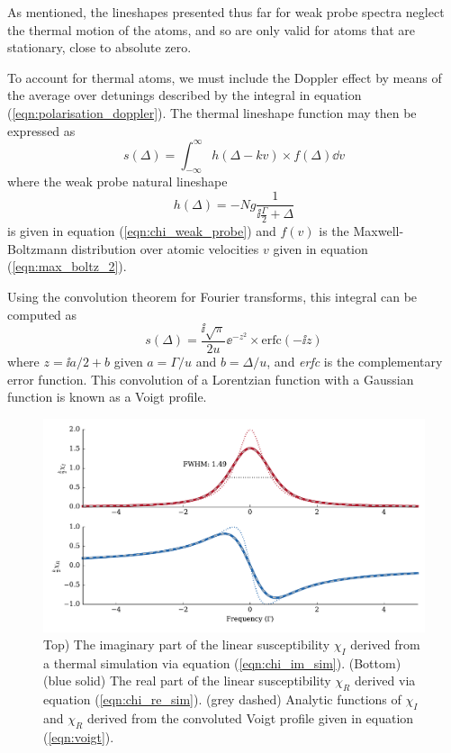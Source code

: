     As mentioned, the lineshapes presented thus far for weak probe spectra
    neglect the thermal motion of the atoms, and so are only valid for atoms
    that are stationary, \ie close to absolute zero. 

    To account for thermal atoms, we must include the Doppler effect by means of
    the average over detunings described by the integral in equation
    (\ref{eqn:polarisation_doppler}). The thermal lineshape function may then be
    expressed as
    \begin{equation}
      s(\Delta) = \int_{-\infty}^\infty h(\Delta - k v) \times f(\Delta) \dd v
    \end{equation}
    where the weak probe natural lineshape
    \begin{equation}
      h(\Delta) = -Ng \frac{1}{\ii \frac{\Gamma}{2} + \Delta}
    \end{equation}
    is given in equation (\ref{eqn:chi_weak_probe}) and $f(v)$ is the Maxwell-
    Boltzmann distribution over atomic velocities $v$ given in equation
    (\ref{eqn:max_boltz_2}).

    Using the convolution theorem for Fourier transforms, this integral can be computed as
    \begin{equation}
      s(\Delta) = \frac{\ii\sqrt{\pi}}{2u} \ee^{-z^2} \times \mathrm{erfc}(-\ii z)
      \label{eqn:voigt}
    \end{equation}
    where $z = \ii a/2  + b$ given $a = \Gamma/u$ and $b = \Delta/u$, and
    \textit{erfc} is the complementary error function.\cite{Siddons2008} This
    convolution of a Lorentzian function with a Gaussian function is known as a
    Voigt profile.

    \begin{figure}[]
      \includegraphics[width=\linewidth]{figs/02_propagation/mb_two_solve_wpdopp_t01_Ng0010_vel05_D10_2_fig3.pdf}
      \caption{
      Top) The imaginary part of the linear susceptibility $\chi_I$ derived from
      a thermal simulation via equation (\ref{eqn:chi_im_sim}). (Bottom) (blue
      solid) The real part of the linear susceptibility $\chi_R$ derived via
      equation (\ref{eqn:chi_re_sim}). (grey dashed) Analytic functions of
      $\chi_I$ and $\chi_R$ derived from the convoluted Voigt profile given in
      equation (\ref{eqn:voigt}).
      } 
      \label{fig:linear_scan_dopp}
    \end{figure}

